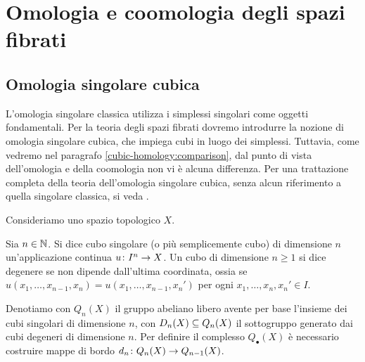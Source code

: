 \chapter{Omologia e coomologia degli spazi fibrati}
\label{ch:homology-and-cohomology-of-fibrations}
\section{Omologia singolare cubica}

L'omologia singolare classica utilizza i simplessi singolari come oggetti fondamentali. Per la teoria degli spazi fibrati dovremo introdurre la nozione di omologia singolare cubica, che impiega cubi in luogo dei simplessi. Tuttavia, come vedremo nel paragrafo \ref{cubic-homology:comparison}, dal punto di vista dell'omologia e della coomologia non vi è alcuna differenza. Per una trattazione completa della teoria dell'omologia singolare cubica, senza alcun riferimento a quella singolare classica, si veda \cite{massey}.

Consideriamo uno spazio topologico $X$.

\begin{definition}
Sia $n\in\mathbb{N}$. Si dice cubo singolare (o più semplicemente cubo) di dimensione $n$ un'applicazione continua $u\colon I^n\to X$. Un cubo di dimensione $n\ge 1$ si dice degenere se non dipende dall'ultima coordinata, ossia se $u(x_1,\ldots,x_{n-1},x_n)=u(x_1,\ldots,x_{n-1},x_n')$ per ogni $x_1,\ldots,x_n,x_n'\in I$.
\end{definition}

Denotiamo con $Q_n(X)$ il gruppo abeliano libero avente per base l'insieme dei cubi singolari di dimensione $n$, con $D_n(X)\subseteq Q_n(X)$ il sottogruppo generato dai cubi degeneri di dimensione $n$. Per definire il complesso $Q_\bullet(X)$ è necessario costruire mappe di bordo $d_n\colon Q_n(X)\to Q_{n-1}(X)$.

